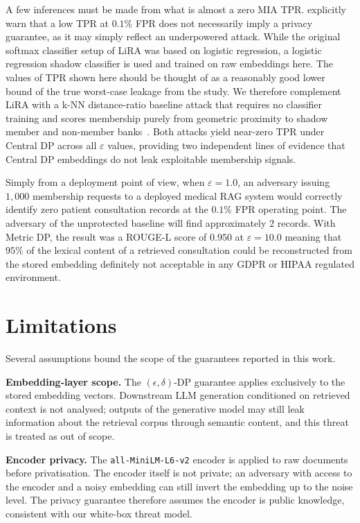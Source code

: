\documentclass[11pt, a4paper]{article}
\begin{document}
A few inferences must be made from what is almost a zero MIA TPR. \citet{carlini2022membership} explicitly warn that a low TPR at $0.1\%$ FPR does not necessarily imply a privacy guarantee, as it may simply reflect an underpowered attack. While the original softmax classifier setup of LiRA was based on logistic regression, a logistic regression shadow classifier is used and trained on raw embeddings here. The values of TPR shown here should be thought of as a reasonably good lower bound of the true worst-case leakage from the study. We therefore complement LiRA with a k-NN distance-ratio baseline attack that requires no classifier training and scores membership purely from geometric proximity to shadow member and non-member banks~\cite{carlini2022membership}. Both attacks yield near-zero TPR under Central DP across all $\varepsilon$ values, providing two independent lines of evidence that Central DP embeddings do not leak exploitable membership signals.

Simply from a deployment point of view, when $\varepsilon=1.0$, an adversary issuing $1{,}000$ membership requests to a deployed medical RAG system would correctly identify zero patient consultation records at the $0.1\%$ FPR operating point. The adversary of the unprotected baseline will find approximately $2$ records. With Metric DP, the result was a ROUGE-L score of $0.950$ at $\varepsilon=10.0$   meaning that $95\%$ of the lexical content of a retrieved consultation could be reconstructed from the stored embedding   definitely not acceptable in any GDPR or HIPAA regulated environment.

\section{Limitations}

Several assumptions bound the scope of the guarantees reported in this work.

\textbf{Embedding-layer scope.} The $(\epsilon, \delta)$-DP guarantee applies
exclusively to the stored embedding vectors. Downstream LLM generation
conditioned on retrieved context is not analysed; outputs of the generative
model may still leak information about the retrieval corpus through semantic
content, and this threat is treated as out of scope.

\textbf{Encoder privacy.} The \texttt{all-MiniLM-L6-v2} encoder is applied
to raw documents before privatisation. The encoder itself is not private; an
adversary with access to the encoder and a noisy embedding can still invert
the embedding up to the noise level. The privacy guarantee therefore assumes
the encoder is public knowledge, consistent with our white-box threat model.
\end{document}
